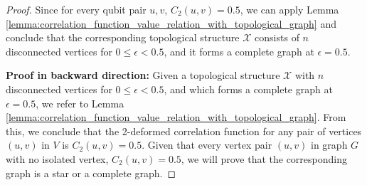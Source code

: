 \documentclass{article}
\begin{document}
\begin{proof}

Since for every qubit pair $u, v$, $C_2(u, v) = 0.5$, we can apply Lemma \ref{lemma:correlation_function_value_relation_with_topological_graph}
and conclude that the corresponding topological structure $ \mathcal{X} $ consists of $ n $ disconnected vertices for $ 0 \leq \epsilon < 0.5 $, and it forms a complete graph at $ \epsilon = 0.5 $.



\textbf{Proof in backward direction:}
Given a topological structure $ \mathcal{X} $ with $ n $ disconnected vertices for $ 0 \leq \epsilon < 0.5 $, and which forms a complete graph at $ \epsilon = 0.5 $, we refer to Lemma \eqref{lemma:correlation_function_value_relation_with_topological_graph}. From this, we conclude that the 2-deformed correlation function for any pair of vertices $ (u, v) $ in $V$ is $ C_2(u, v) = 0.5 $. Given that every vertex pair $(u, v)$ in graph $G$ with no isolated vertex, $C_2(u, v) = 0.5$, we will prove that the corresponding graph is a star or a complete graph.


\end{proof}
\end{document}
